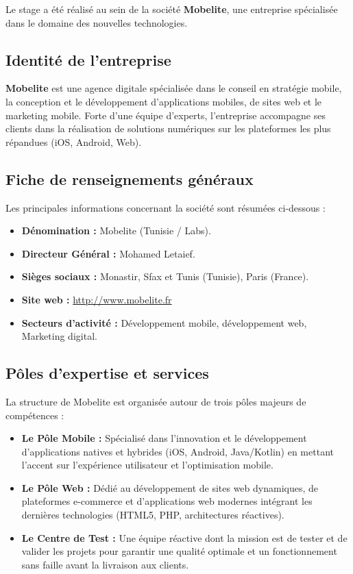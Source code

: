 \documentclass[12pt, a4paper, oneside]{report}
\begin{document}
Le stage a été réalisé au sein de la société \textbf{Mobelite}, une entreprise spécialisée dans le domaine des nouvelles technologies. 

\subsection{Identité de l'entreprise}
\textbf{Mobelite} est une agence digitale spécialisée dans le conseil en stratégie mobile, la conception et le développement d'applications mobiles, de sites web et le marketing mobile. Forte d'une équipe d'experts, l'entreprise accompagne ses clients dans la réalisation de solutions numériques sur les plateformes les plus répandues (iOS, Android, Web).

\subsection{Fiche de renseignements généraux}
Les principales informations concernant la société sont résumées ci-dessous :
\begin{itemize}
    \item \textbf{Dénomination :} Mobelite (Tunisie / Labs).
    \item \textbf{Directeur Général :} Mohamed Letaief.
    \item \textbf{Sièges sociaux :} Monastir, Sfax et Tunis (Tunisie), Paris (France).
    \item \textbf{Site web :} \url{http://www.mobelite.fr}
    \item \textbf{Secteurs d'activité :} Développement mobile, développement web, Marketing digital.
\end{itemize}

\subsection{Pôles d'expertise et services}
La structure de Mobelite est organisée autour de trois pôles majeurs de compétences :
\begin{itemize}
    \item \textbf{Le Pôle Mobile :} Spécialisé dans l'innovation et le développement d'applications natives et hybrides (iOS, Android, Java/Kotlin) en mettant l'accent sur l'expérience utilisateur et l'optimisation mobile.
    \item \textbf{Le Pôle Web :} Dédié au développement de sites web dynamiques, de plateformes e-commerce et d'applications web modernes intégrant les dernières technologies (HTML5, PHP, architectures réactives).
    \item \textbf{Le Centre de Test :} Une équipe réactive dont la mission est de tester et de valider les projets pour garantir une qualité optimale et un fonctionnement sans faille avant la livraison aux clients.
\end{itemize}
\end{document}
